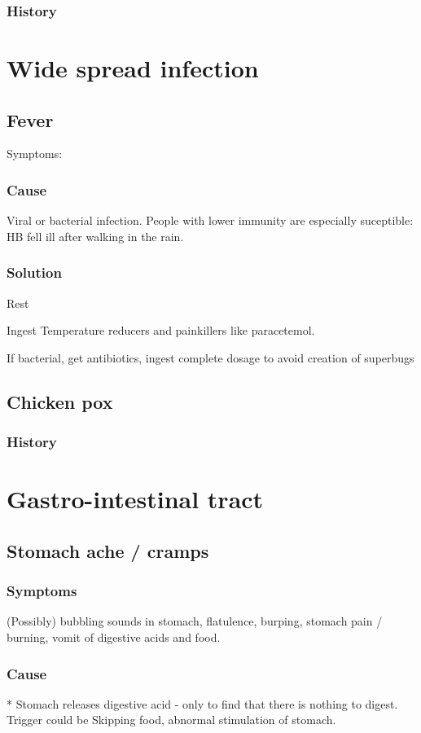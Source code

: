 \documentclass[oneside, article]{memoir}
\begin{document}
\subsection{History}


\chapter{Wide spread infection}
\section{Fever}
Symptoms:
\subsection{Cause}
Viral or bacterial infection. People with lower immunity are especially suceptible: HB fell ill after walking in the  rain.

\subsection{Solution}
Rest

Ingest Temperature reducers and painkillers like paracetemol.

If bacterial, get antibiotics, ingest complete dosage to avoid creation of superbugs

\section{Chicken pox}
\subsection{History}


\chapter{Gastro-intestinal tract}
\section{Stomach ache / cramps}
\subsection{Symptoms}
(Possibly) bubbling sounds in stomach, flatulence, burping, stomach pain / burning, vomit of digestive acids and food.

\subsection{Cause}
    * Stomach releases digestive acid - only to find that there is nothing to digest. Trigger could be Skipping food, abnormal stimulation of stomach.
    
\end{document}
